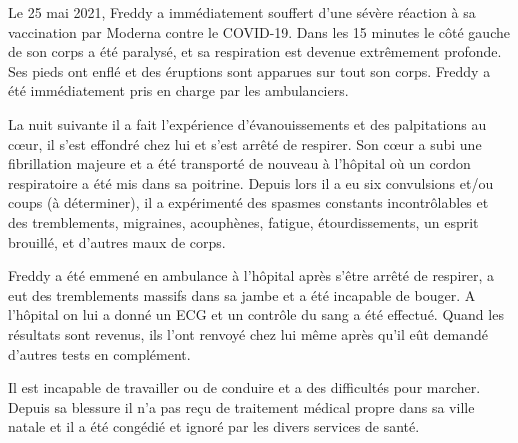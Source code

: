 Le 25 mai 2021, Freddy a immédiatement souffert d’une sévère réaction à sa
vaccination par Moderna contre le COVID-19. Dans les 15 minutes le côté gauche
de son corps a été paralysé, et sa respiration est devenue extrêmement
profonde. Ses pieds ont enflé et des éruptions sont apparues sur tout son
corps. Freddy a été immédiatement pris en charge par les ambulanciers.

La nuit suivante il a fait l’expérience d’évanouissements et des palpitations au
cœur, il s’est effondré chez lui et s’est arrêté de respirer. Son cœur a subi
une fibrillation majeure et a été transporté de nouveau à l’hôpital où un cordon
respiratoire a été mis dans sa poitrine. Depuis lors il a eu six convulsions
et/ou coups (à déterminer), il a expérimenté des spasmes constants
incontrôlables et des tremblements, migraines, acouphènes, fatigue,
étourdissements, un esprit brouillé, et d’autres maux de corps.

Freddy a été emmené en ambulance à l’hôpital après s’être arrêté de respirer, a
eut des tremblements massifs dans sa jambe et a été incapable de bouger. A
l’hôpital on lui a donné un ECG et un contrôle du sang a été effectué. Quand les
résultats sont revenus, ils l’ont renvoyé chez lui même après qu’il eût demandé
d’autres tests en complément.

Il est incapable de travailler ou de conduire et a des difficultés pour
marcher. Depuis sa blessure il n’a pas reçu de traitement médical propre dans sa
ville natale et il a été congédié et ignoré par les divers services de santé.


